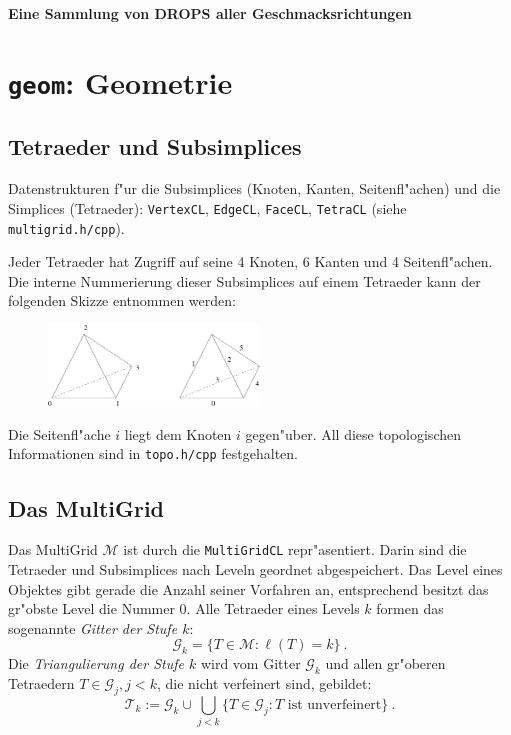 \documentclass[11pt,a4paper]{article}
\begin{document}
\newcommand{\prg}[1]{{\tt #1}}

{\Large\bf Eine Sammlung von DROPS aller Geschmacksrichtungen}

\tableofcontents

\section{{\tt geom}: Geometrie}

\subsection{Tetraeder und Subsimplices}

Datenstrukturen f"ur die Subsimplices (Knoten, Kanten, Seitenfl"achen) und die
Simplices (Tetraeder): 
\prg{VertexCL}, \prg{EdgeCL}, \prg{FaceCL}, \prg{TetraCL} (siehe
\prg{multigrid.h/cpp}).

Jeder Tetraeder hat Zugriff auf seine 4 Knoten, 6 Kanten und 4 Seitenfl"achen.
Die interne Nummerierung dieser Subsimplices auf einem Tetraeder kann der 
folgenden Skizze entnommen werden:
\begin{figure}[ht!]
\centering
\includegraphics[width=0.5\textwidth]{tetra}
\end{figure}

Die Seitenfl"ache $i$ liegt dem Knoten $i$ gegen"uber. All diese topologischen
Informationen sind in \prg{topo.h/cpp} festgehalten.

\subsection{Das MultiGrid}

Das MultiGrid $\mathcal M$ ist durch die \prg{MultiGridCL} repr"asentiert.
Darin sind die Tetraeder und Subsimplices nach Leveln geordnet abgespeichert.
Das Level eines Objektes gibt gerade die Anzahl seiner Vorfahren an,
entsprechend besitzt das gr"obste Level die Nummer 0. Alle Tetraeder eines
Levels $k$ formen das  sogenannte \emph{Gitter der Stufe $k$}: 
$$
\mathcal G_k=\{T\in\mathcal M: \ell(T)=k\} ~.
$$
Die \emph{Triangulierung der Stufe $k$}
wird vom Gitter $\mathcal G_k$ und allen gr"oberen Tetraedern $T\in\mathcal
G_j, j<k$, die nicht verfeinert sind, gebildet: 
$$
\mathcal T_k:=\mathcal G_k \cup\bigcup_{j<k}\{T\in\mathcal G_j: T\mbox{ ist
unverfeinert}\} ~.
$$
\end{document}
